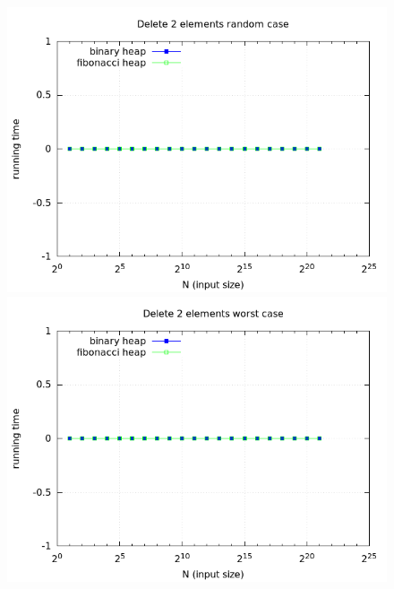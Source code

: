 \documentclass[a4paper,oneside,article,11pt]{memoir}
\begin{document}
\begin{figure}[H]
\centering
\begin{minipage}{0.48\columnwidth}
  \centering
  \includegraphics[width=\linewidth]{../res/delmin/delmin_del_2_time_random.png}%
  \caption{}
  \label{fig:delmin_2_random_time}
\end{minipage}%
\hfill
\begin{minipage}{0.48\columnwidth}
  \centering
  \includegraphics[width=\linewidth]{../res/delmin/delmin_del_2_time_worst.png}%
  \caption{}
  \label{fig:delmin_2_worst_time}
\end{minipage}
\end{figure}
\end{document}
